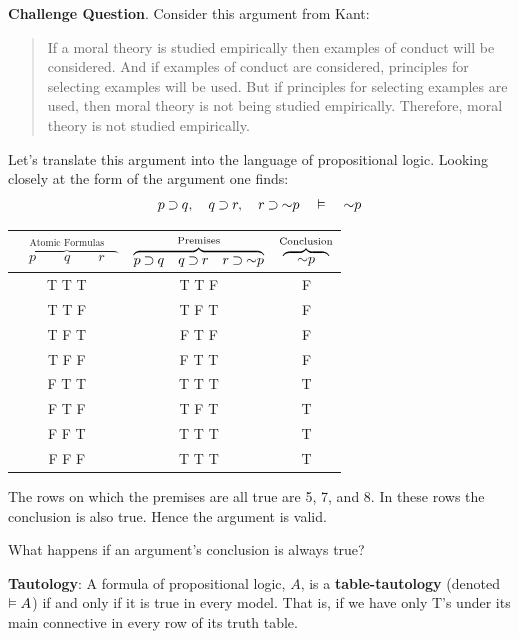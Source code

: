 \documentclass[options]{philosophersimprint}
\theoremstyle{definition}
\begin{document}
\textbf{Challenge Question}. Consider this argument from Kant:
\begin{quote}
If a moral theory is studied empirically then examples of conduct will be considered. And if examples of conduct are considered, principles for selecting examples will be used. But if principles for selecting examples are used, then moral theory is not being studied empirically. Therefore, moral theory is not studied empirically.
\end{quote}
Let's translate this argument into the language of propositional logic. Looking closely at the form of the argument one finds:
$$p\mathbin{\supset} q, \quad q\mathbin{\supset} r, \quad r\mathbin{\supset} \mathord{\sim} p \quad \vDash \quad \mathord{\sim} p$$
\vspace{-1cm}
\begin{table}[h!]
            \centering
            \begin{tabular}{c | c | c }
                 $\overbrace{\quad p \qquad q\qquad r\quad}^\text{Atomic Formulas}$ & $\overbrace{p\mathbin{\supset} q \quad q\mathbin{\supset} r \quad r\mathbin{\supset} \mathord{\sim} p}^\text{Premises}$ & $\overbrace{\quad\mathord{\sim} p\quad}^\text{Conclusion}$ \\
                 \hline
                 T \qquad T \qquad T & T \qquad T \qquad F & F\\
                 T \qquad T \qquad F & T \qquad F \qquad T & F\\
                 T \qquad F \qquad T & F \qquad T \qquad F & F\\
                 T \qquad F \qquad F & F \qquad T \qquad T & F\\
                 F \qquad T \qquad T & T \qquad T \qquad T & T\\
                 F \qquad T \qquad F & T \qquad F \qquad T & T\\
                 F \qquad F \qquad T & T \qquad T \qquad T & T\\
                 F \qquad F \qquad F & T \qquad T \qquad T & T
            \end{tabular}
        \end{table}

The rows on which the premises are all true are 5, 7, and 8. In these rows the conclusion is also true. Hence the argument is valid.

What happens if an argument's conclusion is always true?

\textbf{Tautology}: A formula of propositional logic, $A$, is a \textbf{table-tautology} (denoted $\vDash A$) if and only if it is true in every model. That is, if we have only T's under its main connective in every row of its truth table.
\end{document}
